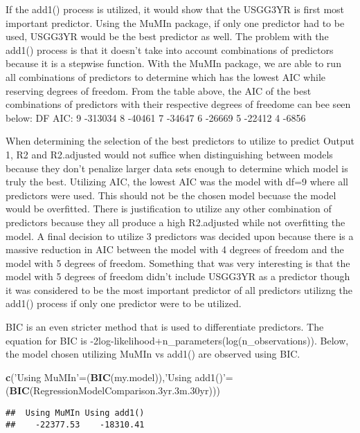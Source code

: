 \documentclass[]{article}
\newenvironment{Shaded}{\begin{snugshade}}{\end{snugshade}}
\newcommand{\KeywordTok}[1]{\textcolor[rgb]{0.13,0.29,0.53}{\textbf{#1}}}
\newcommand{\StringTok}[1]{\textcolor[rgb]{0.31,0.60,0.02}{#1}}
\newcommand{\NormalTok}[1]{#1}
\begin{document}
If the add1() process is utilized, it would show that the USGG3YR is
first most important predictor. Using the MuMIn package, if only one
predictor had to be used, USGG3YR would be the best predictor as well.
The problem with the add1() process is that it doesn't take into account
combinations of predictors because it is a stepwise function. With the
MuMIn package, we are able to run all combinations of predictors to
determine which has the lowest AIC while reserving degrees of freedom.
From the table above, the AIC of the best combinations of predictors
with their respective degrees of freedome can bee seen below: DF AIC: 9
-313034 8 -40461 7 -34647 6 -26669 5 -22412 4 -6856

When determining the selection of the best predictors to utilize to
predict Output 1, R2 and R2.adjusted would not suffice when
distinguishing between models because they don't penalize larger data
sets enough to determine which model is truly the best. Utilizing AIC,
the lowest AIC was the model with df=9 where all predictors were used.
This should not be the chosen model becuase the model would be
overfitted. There is justification to utilize any other combination of
predictors because they all produce a high R2.adjusted while not
overfitting the model. A final decision to utilize 3 predictors was
decided upon because there is a massive reduction in AIC between the
model with 4 degrees of freedom and the model with 5 degrees of freedom.
Something that was very interesting is that the model with 5 degrees of
freedom didn't include USGG3YR as a predictor though it was considered
to be the most important predictor of all predictors utilizng the add1()
process if only one predictor were to be utilized.

BIC is an even stricter method that is used to differentiate predictors.
The equation for BIC is
-2log-likelihood+n\_parameters(log(n\_observations)). Below, the model
chosen utilizing MuMIn vs add1() are observed using BIC.

\begin{Shaded}
\begin{Highlighting}[]
\KeywordTok{c}\NormalTok{(}\StringTok{'Using MuMIn'}\NormalTok{=(}\KeywordTok{BIC}\NormalTok{(my.model)),}\StringTok{'Using add1()'}\NormalTok{=(}\KeywordTok{BIC}\NormalTok{(RegressionModelComparison.3yr.3m.30yr)))}
\end{Highlighting}
\end{Shaded}

\begin{verbatim}
##  Using MuMIn Using add1() 
##    -22377.53    -18310.41
\end{verbatim}
\end{document}
